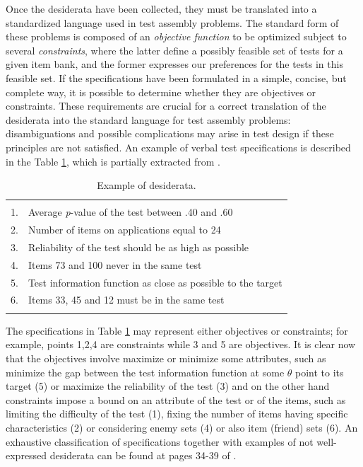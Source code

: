 Once the desiderata have been collected, they must be translated into a standardized language used in test assembly problems.
The standard form of these problems is composed of an \emph{objective function} to be optimized subject to several \emph{constraints}, where the latter define a possibly feasible set of tests for a given item bank, and the former expresses our preferences for the tests in this feasible set.
If the specifications have been formulated in a simple, concise, but complete way, it is possible to determine whether they are objectives or constraints.
These requirements are crucial for a correct translation of the desiderata into the standard language for test assembly problems: disambiguations and possible complications may arise in test design if these principles are not satisfied.
An example of verbal test specifications is described in the Table \ref{tab:exspec}, which is partially extracted from \textcite{VDL2005}.

\begin{table}
	\centering
	\begin{tabular}{|ll|}
		\hline & \\
		1. & Average \textit{p}-value of the test between .40 and .60 \\
		2. & Number of items on applications equal to 24 \\
		3. & Reliability of the test should be as high as possible \\
		4. & Items 73 and 100 never in the same test \\
		5. & Test information function as close as possible to the target \\
		6. & Items 33, 45 and 12 must be in the same test \\
		& \\
		\hline
	\end{tabular}
	\caption{Example of desiderata.}\label{tab:exspec}
\end{table}

The specifications in Table \ref{tab:exspec} may represent either objectives or constraints; for example, points 1,2,4 are constraints while 3 and 5 are objectives.
It is clear now that the objectives involve maximize or minimize some attributes, such as minimize the gap between the test information function at some $\theta$ point to its target (5) or maximize the reliability of the test (3) and on the other hand constraints impose a bound on an attribute of the test or of the items, such as limiting the difficulty of the test (1), fixing the number of items having specific characteristics (2) or considering enemy sets (4) or also item (friend) sets (6). An exhaustive classification of specifications together with examples of not well-expressed desiderata can be found at pages 34-39 of \textcite{VDL2005}.

